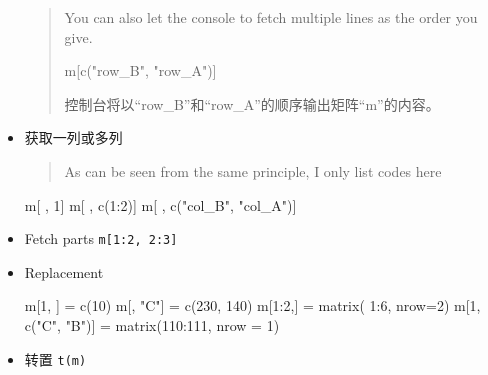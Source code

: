 \documentclass[
]{article}
\newenvironment{Shaded}{}{}
\newcommand{\AttributeTok}[1]{\textcolor[rgb]{0.49,0.56,0.16}{#1}}
\newcommand{\DecValTok}[1]{\textcolor[rgb]{0.25,0.63,0.44}{#1}}
\newcommand{\FunctionTok}[1]{\textcolor[rgb]{0.02,0.16,0.49}{#1}}
\newcommand{\NormalTok}[1]{#1}
\newcommand{\OtherTok}[1]{\textcolor[rgb]{0.00,0.44,0.13}{#1}}
\newcommand{\SpecialCharTok}[1]{\textcolor[rgb]{0.25,0.44,0.63}{#1}}
\newcommand{\StringTok}[1]{\textcolor[rgb]{0.25,0.44,0.63}{#1}}
\begin{document}
\begin{itemize}
  \begin{quote}
  You can also let the console to fetch multiple lines as the order you
  give.

\begin{Shaded}
\begin{Highlighting}[]
\NormalTok{m[}\FunctionTok{c}\NormalTok{(}\StringTok{"row\_B"}\NormalTok{, }\StringTok{"row\_A"}\NormalTok{)]}
\end{Highlighting}
\end{Shaded}

  控制台将以``row\_B''和``row\_A''的顺序输出矩阵``m''的内容。
  \end{quote}
\item
  获取一列或多列

  \begin{quote}
  As can be seen from the same principle, I only list codes here
  \end{quote}

\begin{Shaded}
\begin{Highlighting}[]
\NormalTok{m[ , }\DecValTok{1}\NormalTok{]}
\NormalTok{m[ , }\FunctionTok{c}\NormalTok{(}\DecValTok{1}\SpecialCharTok{:}\DecValTok{2}\NormalTok{)]}
\NormalTok{m[ , }\FunctionTok{c}\NormalTok{(}\StringTok{"col\_B"}\NormalTok{, }\StringTok{"col\_A"}\NormalTok{)]}
\end{Highlighting}
\end{Shaded}
\item
  Fetch parts \texttt{m{[}1:2,\ 2:3{]}}
\item
  Replacement

\begin{Shaded}
\begin{Highlighting}[]
\NormalTok{m[}\DecValTok{1}\NormalTok{, ] }\OtherTok{=} \FunctionTok{c}\NormalTok{(}\DecValTok{10}\NormalTok{)}
\NormalTok{m[, }\StringTok{"C"}\NormalTok{] }\OtherTok{=} \FunctionTok{c}\NormalTok{(}\DecValTok{230}\NormalTok{, }\DecValTok{140}\NormalTok{)}
\NormalTok{m[}\DecValTok{1}\SpecialCharTok{:}\DecValTok{2}\NormalTok{,] }\OtherTok{=} \FunctionTok{matrix}\NormalTok{( }\DecValTok{1}\SpecialCharTok{:}\DecValTok{6}\NormalTok{, }\AttributeTok{nrow=}\DecValTok{2}\NormalTok{)}
\NormalTok{m[}\DecValTok{1}\NormalTok{, }\FunctionTok{c}\NormalTok{(}\StringTok{"C"}\NormalTok{, }\StringTok{"B"}\NormalTok{)] }\OtherTok{=} \FunctionTok{matrix}\NormalTok{(}\DecValTok{110}\SpecialCharTok{:}\DecValTok{111}\NormalTok{, }\AttributeTok{nrow =} \DecValTok{1}\NormalTok{)}
\end{Highlighting}
\end{Shaded}
\item
  转置 \texttt{t(m)}
\end{itemize}
\end{document}
